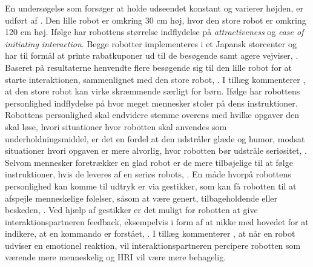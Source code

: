 En undersøgelse som forsøger at holde udseendet konstant og varierer højden, er udført af \textcite[s. 255]{PDF:RecommendationEffects}. Den lille robot er omkring 30 cm høj, hvor den store robot er omkring 120 cm høj. Ifølge \textcite[s. 255]{PDF:RecommendationEffects} har robottens størrelse indflydelse på \textit{attractiveness} og \textit{ease of initiating interaction}. Begge robotter implementeres i et Japansk storcenter og har til formål at printe rabatkuponer ud til de besøgende samt agere vejviser, \textcite[s. 252]{PDF:RecommendationEffects}. Baseret på resultaterne henvendte flere besøgende sig til den lille robot for at starte interaktionen, sammenlignet med den store robot, \parencite[s. 260]{PDF:RecommendationEffects}. I tillæg kommenterer \textcite[s. 260]{PDF:RecommendationEffects}, at den store robot kan virke skræmmende særligt for børn.\blankline
%
Ifølge \textcite[s. 226]{PDF:SocailAndCollaborative} har robottens personlighed indflydelse på hvor meget mennesker stoler på dens instruktioner. Robottens personlighed skal endvidere stemme overens med hvilke opgaver den skal løse, hvori situationer hvor robotten skal anvendes som underholdningsmiddel, er det en fordel at den udstråler glæde og humor, modsat situationer hvori opgaven er mere alvorlig, hvor robotten bør udstråle seriøsitet, \parencite[s. 226]{PDF:SocailAndCollaborative}. Selvom mennesker foretrækker en glad robot er de mere tilbøjelige til at følge instruktioner, hvis de leveres af en seriøs robots, \parencite[s. 226]{PDF:SocailAndCollaborative}. En måde hvorpå robottens personlighed kan komme til udtryk er via gestikker, som kan få robotten til at afspejle menneskelige følelser, såsom at være genert, tilbageholdende eller beskeden, \parencite[s. 227]{PDF:SocailAndCollaborative}. Ved hjælp af gestikker er det muligt for robotten at give interaktionspartneren feedback, eksempelvis i form af at nikke med hovedet for at indikere, at en kommando er forstået, \parencite[s. 228]{PDF:SocailAndCollaborative}. I tillæg kommenterer \textcite[s. 61]{PDF:EffectsOfAnticipatedHRI}, at når en robot udviser en emotionel reaktion, vil interaktionspartneren percipere robotten som værende mere menneskelig og HRI vil være mere behagelig.    


 

  
  
 
 


 




